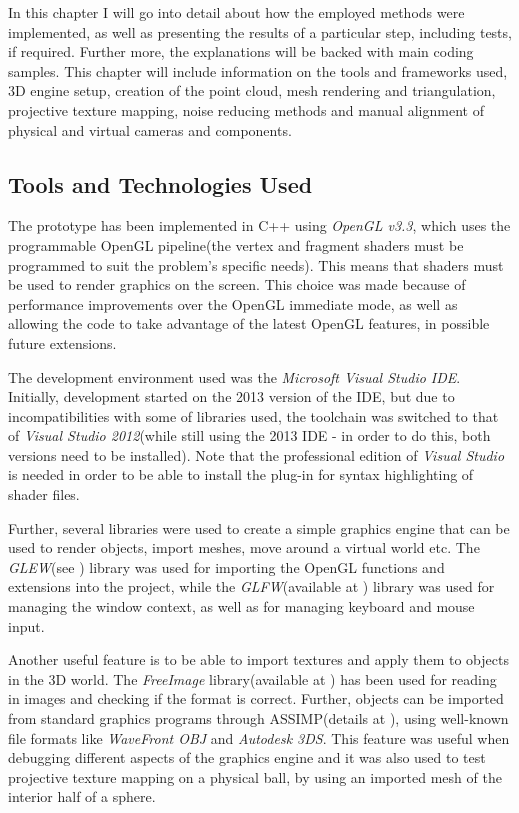\documentclass[]{article}
\begin{document}
In this chapter I will go into detail about how the employed methods  were implemented, as well as presenting the results of a particular step, including tests, if required. Further more, the explanations will be backed with main coding samples. This chapter will include information on the tools and frameworks used, 3D engine setup, creation of the point cloud, mesh rendering and triangulation, projective texture mapping, noise reducing methods and manual alignment of physical and virtual cameras and components.

\subsection{Tools and Technologies Used}

The prototype has been implemented in C++ using \textit{OpenGL v3.3}, which uses the programmable OpenGL pipeline(the vertex and fragment shaders must be programmed to suit the problem's specific needs). This means that shaders must be used to render graphics on the screen. This choice was made because of performance improvements over the OpenGL immediate mode, as well as allowing the code to take advantage of the latest OpenGL features, in possible future extensions.

The development environment used was the \textit{Microsoft Visual Studio IDE}. Initially, development started on the 2013 version of the IDE, but due to incompatibilities with some of libraries used, the toolchain was switched to that of \textit{Visual Studio 2012}(while still using the 2013 IDE - in order to do this, both versions need to be installed). Note that the professional edition of \textit{Visual Studio} is needed in order to be able to install the plug-in for syntax highlighting of shader files.

Further, several libraries were used to create a simple graphics engine that can be used to render objects, import meshes, move around a virtual world etc. The \textit{GLEW}(see \cite{glew}) library was used for importing the OpenGL functions and extensions into the project, while the \textit{GLFW}(available at \cite{glfw}) library was used for managing the window context, as well as for managing keyboard and mouse input.

Another useful feature is to be able to import textures and apply them to objects in the 3D world. The \textit{FreeImage} library(available at \cite{freeimage}) has been used for reading in images and checking if the format is correct. Further, objects can be imported from standard graphics programs through ASSIMP(details at \cite{assimp}), using well-known file formats like \textit{WaveFront OBJ} and \textit{Autodesk 3DS}. This feature was useful when debugging different aspects of the graphics engine and it was also used to test projective texture mapping on a physical ball, by using an imported mesh of the interior half of a sphere.
\end{document}
